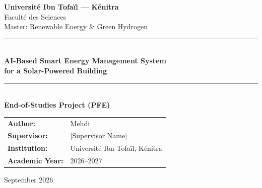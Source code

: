 \begin{titlepage}
\centering

\vspace*{1cm}

{\Large \textbf{Université Ibn Tofaïl — Kénitra}}\\[0.3cm]
{\large Faculté des Sciences}\\[0.3cm]
{\large Master: Renewable Energy \& Green Hydrogen}\\[2cm]

\rule{\textwidth}{1pt}\\[0.5cm]
{\LARGE \textbf{AI-Based Smart Energy Management System\\for a Solar-Powered Building}}\\[0.5cm]
\rule{\textwidth}{1pt}\\[1.5cm]

{\large \textbf{End-of-Studies Project (PFE)}}\\[2cm]

\begin{tabular}{ll}
\textbf{Author:}      & Mehdi \\[0.3cm]
\textbf{Supervisor:}   & [Supervisor Name] \\[0.3cm]
\textbf{Institution:}  & Université Ibn Tofaïl, Kénitra \\[0.3cm]
\textbf{Academic Year:} & 2026--2027 \\
\end{tabular}

\vfill

{\large September 2026}

\end{titlepage}
